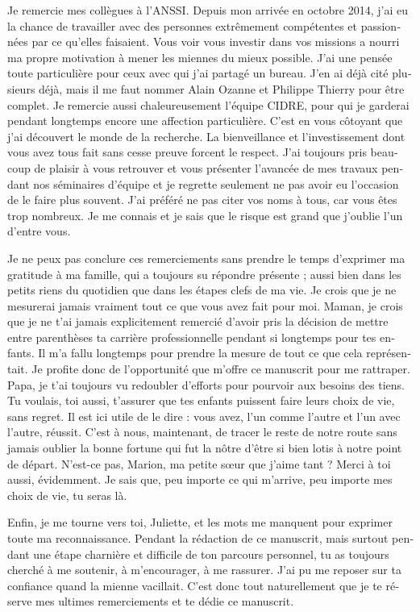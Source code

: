 \begin{otherlanguage}{french}
  Je remercie mes collègues à l’ANSSI. Depuis mon arrivée en octobre 2014, j’ai
  eu la chance de travailler avec des personnes extrêmement compétentes et
  passionnées par ce qu’elles faisaient. Vous voir vous investir dans vos
  missions a nourri ma propre motivation à mener les miennes du mieux
  possible. J’ai une pensée toute particulière pour ceux avec qui j’ai partagé
  un bureau. J’en ai déjà cité plusieurs déjà, mais il me faut nommer Alain
  Ozanne et Philippe Thierry pour être complet.
  Je remercie aussi chaleureusement l’équipe CIDRE, pour qui je garderai pendant
  longtemps encore une affection particulière. C’est en vous côtoyant que j’ai
  découvert le monde de la recherche. La bienveillance et l’investissement dont
  vous avez tous fait sans cesse preuve forcent le respect. J’ai toujours pris
  beaucoup de plaisir à vous retrouver et vous présenter l’avancée de mes
  travaux pendant nos séminaires d’équipe et je regrette seulement ne pas avoir
  eu l’occasion de le faire plus souvent.
  J’ai préféré ne pas citer vos noms à tous, car vous êtes trop nombreux. Je me
  connais et je sais que le risque est grand que j’oublie l’un d’entre vous.

  Je ne peux pas conclure ces remerciements sans prendre le temps d’exprimer ma
  gratitude à ma famille, qui a toujours su répondre présente ; aussi bien dans
  les petits riens du quotidien que dans les étapes clefs de ma vie. Je crois
  que je ne mesurerai jamais vraiment tout ce que vous avez fait pour
  moi. Maman, je crois que je ne t’ai jamais explicitement remercié d’avoir pris
  la décision de mettre entre parenthèses ta carrière professionnelle pendant si
  longtemps pour tes enfants. Il m’a fallu longtemps pour prendre la mesure de
  tout ce que cela représentait. Je profite donc de l’opportunité que m’offre ce
  manuscrit pour me rattraper. Papa, je t’ai toujours vu redoubler d’efforts
  pour pourvoir aux besoins des tiens. Tu voulais, toi aussi, t’assurer que tes
  enfants puissent faire leurs choix de vie, sans regret. Il est ici utile de le
  dire : vous avez, l’un comme l’autre et l’un avec l’autre, réussit. C’est à
  nous, maintenant, de tracer le reste de notre route sans jamais oublier la
  bonne fortune qui fut la nôtre d’être si bien lotis à notre point de départ.
  N’est-ce pas, Marion, ma petite sœur que j’aime tant ? Merci à toi aussi,
  évidemment. Je sais que, peu importe ce qui m’arrive, peu importe mes choix de
  vie, tu seras là.

  Enfin, je me tourne vers toi, Juliette, et les mots me manquent pour exprimer
  toute ma reconnaissance. Pendant la rédaction de ce manuscrit, mais surtout
  pendant une étape charnière et difficile de ton parcours personnel, tu as
  toujours cherché à me soutenir, à m’encourager, à me rassurer. J’ai pu me
  reposer sur ta confiance quand la mienne vacillait. C’est donc tout
  naturellement que je te réserve mes ultimes remerciements et te dédie ce
  manuscrit.
\end{otherlanguage}
